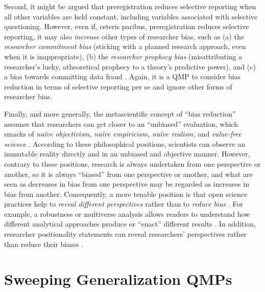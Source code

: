 \documentclass[authordate, meta]{jote-new-article}
\begin{document}
Second, it might be argued that preregistration reduces selective reporting when all other variables are held constant, including variables associated with selective questioning. However, even if, ceteris paribus, preregistration reduces selective reporting, it may also \emph{increase} other types of researcher bias, such as (a) the \emph{researcher commitment bias} (sticking with a planned research approach, even when it is inappropriate), (b) the \emph{researcher prophecy bias} (misattributing a researcher’s lucky, atheoretical prophecy to a theory’s predictive power), and (c) a bias towards committing data fraud \parencites[for a discussion, please see][]{Rubin2022a}. Again, it is a QMP to consider bias reduction in terms of selective reporting per se and ignore other forms of researcher bias.



Finally, and more generally, the metascientific concept of “bias reduction” assumes that researchers can get closer to an “unbiased” evaluation, which smacks of \emph{naïve} \emph{objectivism,} \emph{naïve empiricism, naïve realism, }and\emph{ value-free science} \parencites{Field2021}[p. 228]{Morawski2019}{Reiss2020}{Strong1991}{Dijk2021}{Wiggins2019}. According to these philosophical positions, scientists can observe an immutable reality directly and in an unbiased and objective manner. However, contrary to these positions, research is always undertaken from one perspective or another, so it is always “biased” from one perspective or another, and what are seen as decreases in bias from one perspective may be regarded as increases in bias from another. Consequently, a more tenable position is that open science practices help to \emph{reveal different} \emph{perspectives} rather than to \emph{reduce} \emph{bias} \parencites{Field2021}{Grossmann2021}{Jamieson2023}{Pownall2022}. For example, a robustness or multiverse analysis allows readers to understand how different analytical approaches produce or “enact” different results \parencites{DelGiudice2021}{Morey2019}{Rubin2020}[for a discussion of the “enactment” perspective, see][]{Derksen2022a}. In addition, researcher positionality statements can reveal researchers’ perspectives rather than reduce their biases \parencites{Jamieson2023}.



\section{Sweeping Generalization QMPs}
\end{document}
